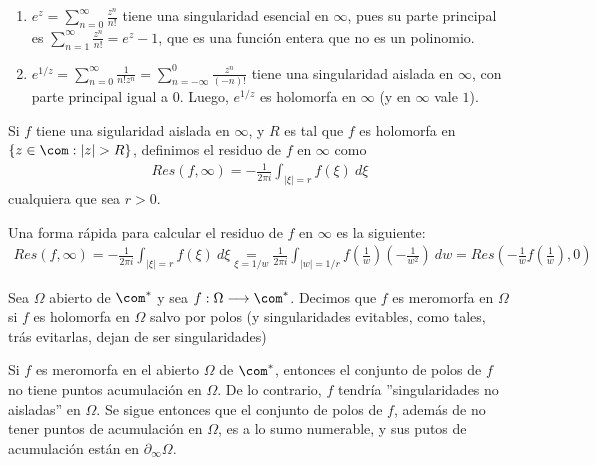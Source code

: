 \begin{obs}
\begin{enumerate}
\begin{enumerate}
        \item $e^z = \sum_{n=0}^{\infty}{\frac{z^n}{n!}}$ tiene una singularidad esencial en $\infty$, pues su parte principal es $\sum_{n=1}^{\infty}{\frac{z^n}{n!}} = e^z -1$, que es una función entera que no es un polinomio.
        \item $e^{1/z} = \sum_{n=0}^{\infty}{\frac{1}{n!z^n}} = \sum_{n=-\infty}^{0}{\frac{z^n}{(-n)!}}$ tiene una singularidad aislada en $\infty$, con parte principal igual a $0$. Luego, $e^{1/z}$ es holomorfa en $\infty$ (y en $\infty$ vale $1$).
    \end{enumerate}
\end{enumerate}
\end{obs}

\begin{defi}
Si $f$ tiene una sigularidad aislada en $\infty$, y $R$ es tal que $f$ es holomorfa en $\{z \in \com : |z| > R\}$, definimos el residuo de $f$ en $\infty$ como
\begin{align*}
    Res(f,\infty) = - \frac{1}{2\pi i}\int_{|\xi| = r}{f(\xi) \ d\xi}
\end{align*}
cualquiera que sea $r > 0$.
\end{defi}

\begin{obs}
Una forma rápida para calcular el residuo de $f$ en $\infty$ es la siguiente:
\begin{align*}
    Res(f,\infty) = - \frac{1}{2\pi i} \int_{|\xi| = r}{f(\xi) \ d\xi} \underset{\xi = 1/w}{=} \frac{1}{2\pi i}\int_{|w| = 1/r}{f\left(\frac{1}{w}\right)\left(-\frac{1}{w^2}\right) \ dw} = Res\left( -\frac{1}{w}f\left(\frac{1}{w} \right),0 \right)
\end{align*}
\end{obs}

\begin{defi}
Sea $\Omega$ abierto de $\com^*$ y sea $f: \Omega \longrightarrow \com^*$. Decimos que $f$ es meromorfa en $\Omega$ si $f$ es holomorfa en $\Omega$ salvo por polos (y singularidades evitables, como tales, trás evitarlas, dejan de ser singularidades)
\end{defi}

\begin{obs}
Si $f$ es meromorfa en el abierto $\Omega$ de $\com^*$, entonces el conjunto de polos de $f$ no tiene puntos acumulación en $\Omega$. De lo contrario, $f$ tendría ''singularidades no aisladas'' en $\Omega$. Se sigue entonces que el conjunto de polos de $f$, además de no tener puntos de acumulación en $\Omega$, es a lo sumo numerable, y sus putos de acumulación están en $\partial_{\infty} \Omega$.
\end{obs}

